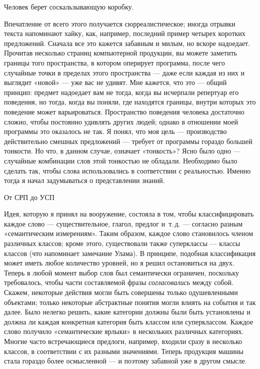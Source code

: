 \documentclass[../main.tex]{subfiles}
\begin{document}
Человек берет соскальзывающую коробку.

Впечатление от всего этого получается сюрреалистическое; иногда отрывки текста напоминают хайку, как, например, последний пример четырех коротких предложений. Сначала все это кажется забавным и милым, но вскоре надоедает. Прочитав несколько страниц компьютерной продукции, вы можете заметить границы того пространства, в котором оперирует программа, после чего случайные точки в пределах этого пространства --- даже если каждая из них и выглядит «новой» --- уже вас не удивят. Мне кажется, что это --- общий принцип: предмет надоедает вам не тогда, когда вы исчерпали репертуар его поведения, но тогда, когда вы поняли, где находятся границы, внутри которых это поведение может варьироваться. Пространство поведения человека достаточно сложно, чтобы постоянно удивлять других людей; однако в отношении моей программы это оказалось не так. Я понял, что моя цель --- производство действительно смешных предложений --- требует от программы гораздо большей тонкости. Но что, в данном случае, означает «тонкость»? Ясно было одно --- случайные комбинации слов этой тонкостью не обладали. Необходимо было сделать так, чтобы слова использовались в соответствии с реальностью. Именно тогда я начал задумываться о представлении знаний.

От СРП до УСП

Идея, которую я принял на вооружение, состояла в том, чтобы классифицировать каждое слово --- существительное, глагол, предлог и~т.\,д. --- согласно разным «семантическим измерениям». Таким образом, каждое слово становилось членом различных классов; кроме этого, существовали также суперклассы --- классы классов (что напоминает замечание Улама). В принципе, подобная классификация может иметь любое количество уровней, но я решил остановиться на двух. Теперь в любой момент выбор слов был семантически ограничен, поскольку требовалось, чтобы части составляемой фразы \emph{согласовались} между собой. Скажем, некоторые действия могли быть совершены только одушевленными объектами; только некоторые абстрактные понятия могли влиять на события и так далее. Было нелегко решить, какие категории должны были быть установлены и должна ли каждая конкретная категория быть классом или суперклассом. Каждое слово получило «семантические ярлыки» в нескольких различных категориях. Многие часто встречающиеся предлоги, например, входили сразу в несколько классов, в соответствии с их разными значениями. Теперь продукция машины стала гораздо более осмысленной --- и поэтому забавной уже в другом смысле.
\end{document}
